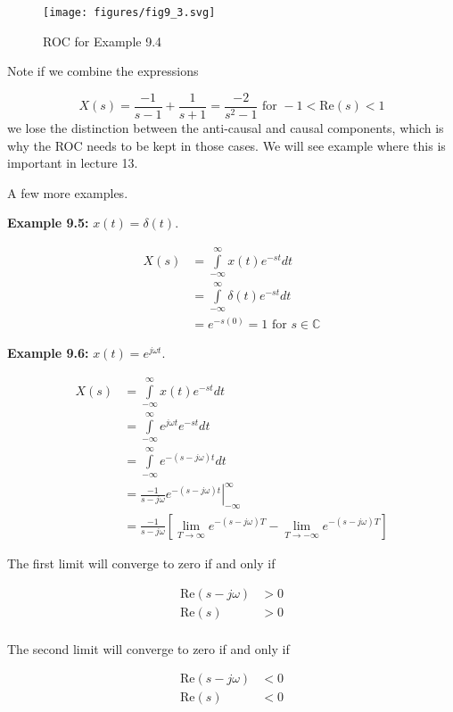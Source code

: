 \documentclass{article}
\begin{document}
\begin{figure}
  \centering
  \texttt{[image: figures/fig9\_3.svg]}
  \caption{ROC for Example 9.4}
\end{figure}

Note if we combine the expressions

\[
X(s) = \frac{-1}{s-1} + \frac{1}{s+1} = \frac{-2}{s^2 - 1} \text{ for } -1 < \text{Re}(s) < 1
\]
we lose the distinction between the anti-causal and causal components, which is why the ROC needs to be kept in those cases. We will see example where this is important in lecture 13.

A few more examples.

\textbf{Example 9.5:} $x(t) = \delta(t)$.

\begin{align}
  X(s) &= \int\limits_{-\infty}^{\infty} x(t) e^{-st} dt\\
  &= \int\limits_{-\infty}^{\infty} \delta(t) e^{-st} dt\\
  &= e^{-s(0)} = 1\text{ for } s\in\mathbb{C}
\end{align}

\textbf{Example 9.6:} $x(t) = e^{j\omega t}$.

\begin{align}
  X(s) &= \int\limits_{-\infty}^{\infty} x(t) e^{-st} dt\\
  &= \int\limits_{-\infty}^{\infty} e^{j\omega t} e^{-st} dt\\
  &= \int\limits_{-\infty}^{\infty} e^{-(s-j\omega)t} dt\\
  &= \frac{-1}{s-j\omega} \left. e^{-(s-j\omega)t} \right|_{-\infty}^{\infty}\\
  &= \frac{-1}{s-j\omega} \left[ \lim_{T\rightarrow \infty} e^{-(s-j\omega)T} -  \lim_{T\rightarrow -\infty} e^{-(s-j\omega)T} \right]
\end{align}

The first limit will converge to zero if and only if

\begin{align}
  \text{Re}(s-j\omega) &> 0\\
  \text{Re}(s) &> 0\\
\end{align}

The second limit will converge to zero if and only if

\begin{align}
  \text{Re}(s-j\omega) &< 0\\
  \text{Re}(s) &< 0\\
\end{align}
\end{document}
